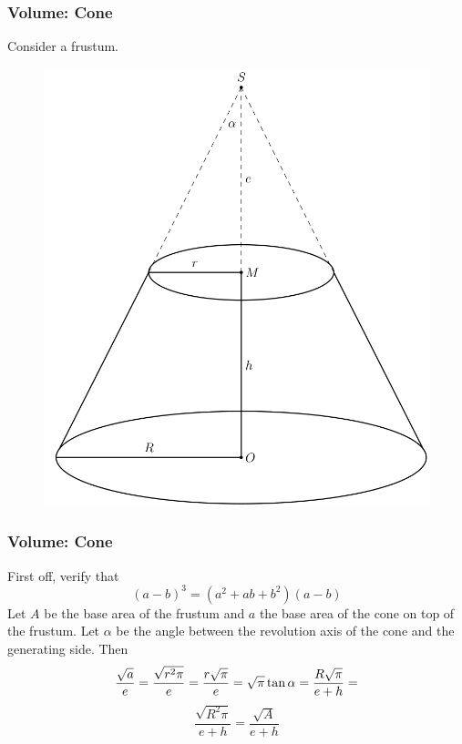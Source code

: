 \documentclass[xcolor=dvipsnames]{beamer}
\begin{document}
\begin{frame}
  \frametitle{Volume: Cone}
Consider a frustum. 
  \begin{figure}[h]
    \includegraphics[scale=.22]{./frustum.png}
  \end{figure}
\end{frame}

\begin{frame}
  \frametitle{Volume: Cone}
  First off, verify that
  \begin{equation}
    \label{eq:oeveezee}
    (a-b)^{3}=(a^{2}+ab+b^{2})(a-b)
  \end{equation}
Let $A$ be the base area of the frustum and $a$ the base area of the
cone on top of the frustum. Let $\alpha$ be the angle between the
revolution axis of the cone and the generating side. Then
\begin{equation}
  \label{eq:aroowiej}
  \frac{\sqrt{a}}{e}=\frac{\sqrt{r^{2}\pi}}{e}=\frac{r\sqrt{\pi}}{e}=\sqrt{\pi}\tan\alpha=\frac{R\sqrt{\pi}}{e+h}=\notag
\end{equation}
\begin{equation}
  \label{eq:hopeexee}
  \frac{\sqrt{R^{2}\pi}}{e+h}=\frac{\sqrt{A}}{e+h}
\end{equation}
\end{frame}
\end{document}
